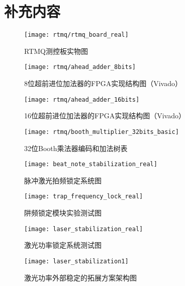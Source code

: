 
\chapter{补充内容}

\begin{figure}
    \centering
    \caption[RTMQ测控板实物图]{RTMQ测控板实物图\label{fig:rtmq_board_real}}
    \texttt{[image: rtmq/rtmq\_board\_real]}
\end{figure}

\begin{figure}
    \centering
    \caption[8位超前进位加法器的FPGA实现结构图]{8位超前进位加法器的FPGA实现结构图（Vivado）\label{fig:ahead_adder_8bits}}
    \texttt{[image: rtmq/ahead\_adder\_8bits]}
\end{figure}

\begin{figure}
    \centering
    \caption[16位超前进位加法器的FPGA实现结构图]{16位超前进位加法器的FPGA实现结构图（Vivado）\label{fig:ahead_adder_16bits}}
    \texttt{[image: rtmq/ahead\_adder\_16bits]}
\end{figure}


\begin{figure}
    \centering
    \caption[32位Booth乘法器编码和加法树表]{32位Booth乘法器编码和加法树表\label{fig:booth_multiplier_32bits_basic}}
    \texttt{[image: rtmq/booth\_multiplier\_32bits\_basic]}
\end{figure}

\begin{figure}
    \centering
    \caption[脉冲激光拍频锁定系统图]{脉冲激光拍频锁定系统图\label{fig:beat_note_stabilization_real}}
    \texttt{[image: beat\_note\_stabilization\_real]}
\end{figure}

\begin{figure}
    \centering
    \caption[阱频锁定模块实验测试图]{阱频锁定模块实验测试图\label{fig:trap_frequency_lock_real}}
    \texttt{[image: trap\_frequency\_lock\_real]}
\end{figure}

\begin{figure}
    \centering
    \caption[激光功率锁定系统测试图]{激光功率锁定系统测试图\label{fig:laser_stabilization_real}}
    \texttt{[image: laser\_stabilization\_real]}
\end{figure}

\begin{figure}
    \centering
    \caption[激光功率外部稳定的拓展方案架构图]{激光功率外部稳定的拓展方案架构图\label{fig:laser_stabilization}}
    \texttt{[image: laser\_stabilization1]}
\end{figure}

